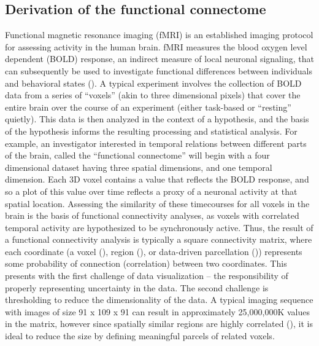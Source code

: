 \documentclass{report}
\begin{document}
\subsection{Derivation of the functional connectome}
Functional magnetic resonance imaging (fMRI) is an established imaging protocol for assessing activity in the human brain. fMRI measures the blood oxygen level dependent (BOLD) response, an indirect measure of local neuronal signaling, that can subsequently be used to investigate functional differences between individuals and behavioral states (\cite{Kim1997-ny,Forster1998-ln}).  A typical experiment involves the collection of BOLD data from a series of ``voxels'' (akin to three dimensional pixels) that cover the entire brain over the course of an experiment (either task-based or ``resting'' quietly). This data is then analyzed in the context of a hypothesis, and the basis of the hypothesis informs the resulting processing and statistical analysis. For example, an investigator interested in temporal relations between different parts of the brain, called the ``functional connectome'' will begin with a four dimensional dataset having three spatial dimensions, and one temporal dimension.  Each 3D voxel contains a value that reflects the BOLD response, and so a plot of this value over time reflects a proxy of a neuronal activity at that spatial location. Assessing the similarity of these timecourses for all voxels in the brain is the basis of functional connectivity analyses, as voxels with correlated temporal activity are hypothesized to be synchronously active. Thus, the result of a functional connectivity analysis is typically a square connectivity matrix, where each coordinate (a voxel (\cite{Van_den_Heuvel2008-ob}), region (\cite{Desikan2006-ut,Evans1994-gq}), or data-driven parcellation (\cite{Beckmann2012-ja,McKeown2003-rt,Damoiseaux2006-wk})) represents some probability of connection (correlation) between two coordinates.  This presents with the first challenge of data visualization – the responsibility of properly representing uncertainty in the data. The second challenge is thresholding to reduce the dimensionality of the data.  A typical imaging sequence with images of size 91 x 109 x 91 can result in approximately 25,000,000K values in the matrix, however since spatially similar regions are highly correlated (\cite{Lindquist2009-ba}), it is ideal to reduce the size by defining meaningful parcels of related voxels.  
\end{document}
